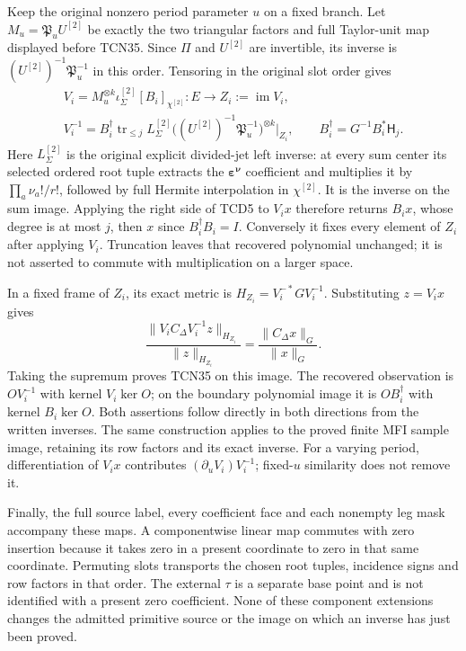 \documentclass[11pt,a4paper]{article}
\begin{document}
Keep the original nonzero period parameter $u$ on a fixed branch.
Let $M_u=\mathfrak P_uU^{[2]}$ be exactly the two triangular factors
and full Taylor-unit map displayed before TCN35. Since $\Pi$ and
$U^{[2]}$ are invertible, its inverse is
$(U^{[2]})^{-1}\mathfrak P_u^{-1}$ in this order. Tensoring in the
original slot order gives
\begin{equation}\tag{TCD5}
\begin{gathered}
 V_i=M_u^{\otimes k}\iota_\Sigma^{[2]}[B_i]_{\chi^{[2]}}:
 E\longrightarrow Z_i:=\operatorname{im}V_i,\\
 V_i^{-1}=B_i^\dagger\operatorname{tr}_{\le j}L_\Sigma^{[2]}
 \bigl((U^{[2]})^{-1}\mathfrak P_u^{-1}\bigr)^{\otimes k}
                 \big|_{Z_i},\qquad
 B_i^\dagger=G^{-1}B_i^*\mathsf H_j.
\end{gathered}
\end{equation}
Here $L_\Sigma^{[2]}$ is the original explicit divided-jet left
inverse: at every sum center its selected ordered root tuple extracts
the $\symbf\varepsilon^{\symbf\nu}$ coefficient and
multiplies it by $\prod_a\nu_a!/r!$, followed by full Hermite interpolation
in $\chi^{[2]}$. It is the inverse on the sum image. Applying the
right side of TCD5 to $V_ix$ therefore returns $B_ix$, whose degree
is at most $j$, then $x$ since $B_i^\dagger B_i=I$. Conversely it
fixes every element of $Z_i$ after applying $V_i$. Truncation leaves
that recovered polynomial unchanged; it is not asserted to commute
with multiplication on a larger space.

In a fixed frame of $Z_i$, its exact metric is
$H_{Z_i}=V_i^{-*}GV_i^{-1}$. Substituting $z=V_ix$ gives
\[
 \frac{\|V_iC_\Delta V_i^{-1}z\|_{H_{Z_i}}}{\|z\|_{H_{Z_i}}}
       =\frac{\|C_\Delta x\|_G}{\|x\|_G}.
\]
Taking the supremum proves TCN35 on this image. The recovered
observation is $OV_i^{-1}$ with kernel $V_i\ker O$; on the boundary
polynomial image it is $OB_i^\dagger$ with kernel $B_i\ker O$.
Both assertions follow directly in both directions from the written
inverses. The same construction applies to the proved finite MFI
sample image, retaining its row factors and its exact inverse.
For a varying period, differentiation of $V_ix$ contributes
$(\partial_uV_i)V_i^{-1}$; fixed-$u$ similarity does not remove it.

Finally, the full source label, every coefficient face and each
nonempty leg mask accompany these maps. A componentwise linear map
commutes with zero insertion because it takes zero in a present
coordinate to zero in that same coordinate. Permuting slots transports
the chosen root tuples, incidence signs and row factors in that order.
The external $\tau$ is a separate base point and is not identified
with a present zero coefficient. None of these component extensions
changes the admitted primitive source or the image on which an inverse
has just been proved.
\end{document}
